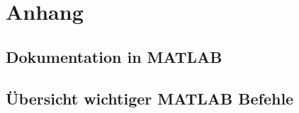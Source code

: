  \section{Anhang}
        \subsection{Dokumentation in MATLAB}
        \subsection{Übersicht wichtiger MATLAB Befehle}